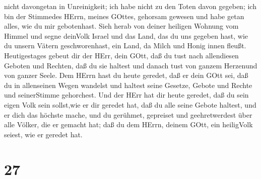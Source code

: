 nicht davongetan in Unreinigkeit; ich habe nicht zu den Toten davon
gegeben; ich bin der Stimmedes HErrn, meines GOttes, gehorsam gewesen
und habe getan alles, wie du mir gebotenhast.  Sieh herab
von deiner heiligen Wohnung vom Himmel und segne deinVolk Israel und das
Land, das du uns gegeben hast, wie du unsern Vätern geschworenhast, ein
Land, da Milch und Honig innen fleußt.  Heutigestages
gebeut dir der HErr, dein GOtt, daß du tust nach allendiesen Geboten und
Rechten, daß du sie haltest und danach tust von ganzem Herzenund von
ganzer Seele.  Dem HErrn hast du heute geredet, daß er dein
GOtt sei, daß du in allenseinen Wegen wandelst und haltest seine
Gesetze, Gebote und Rechte und seinerStimme gehorchest. 
Und der HErr hat dir heute geredet, daß du sein eigen Volk sein
sollst,wie er dir geredet hat, daß du alle seine Gebote haltest,
 und er dich das höchste mache, und du gerühmet, gepreiset
und geehretwerdest über alle Völker, die er gemacht hat; daß du dem
HErrn, deinem GOtt, ein heiligVolk seiest, wie er geredet hat.

\hypertarget{section-26}{%
\section{27}\label{section-26}}

